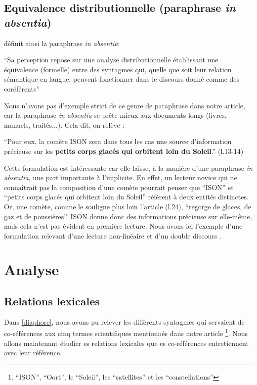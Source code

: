 \documentclass[a4paper,10pt]{article}
\begin{document}
	\subsection{Equivalence distributionnelle (paraphrase \textit{in absentia})}
		\cite{Mortureux1993} définit ainsi la paraphrase \textit{in absentia}:
		\begin{center}
			\footnotesize
			\begin{minipage}{0.7\textwidth}
				``Sa perception repose sur une analyse distributionnelle établissant une équivalence (formelle) entre des syntagmes qui, quelle que soit leur relation sémantique en langue, peuvent fonctionner dans le discours donné comme des coréférents''
			\end{minipage}
		\end{center}
		Nous n'avons pas d'exemple strict de ce genre de paraphrase dans notre article, car la paraphrase \textit{in absentia} se prête mieux aux documents longs (livres, manuels, traités...). Cela dit, on relève :
		\begin{center}
			\footnotesize
			\begin{minipage}{0.7\textwidth}
				``Pour eux, la comète ISON sera dans tous les cas une source d'information précieuse sur les \textbf{petits corps glacés qui orbitent loin du Soleil}.'' (l.13-14)
			\end{minipage}
		\end{center}
		Cette formulation est intéressante car elle laisse, à la manière d'une paraphrase \textit{in absentia}, une part importante à l'implicite. En effet, un lecteur novice qui ne connaîtrait pas la composition d'une comète pourrait penser que ``ISON'' et ``petits corps glacés qui orbitent loin du Soleil'' réfèrent à deux entités distinctes. Or, une comète, comme le souligne plus loin l'article (l.24), ``regorge de glaces, de gaz et de poussières''. ISON donne donc des informations précieuse sur elle-même, mais cela n'est pas évident en première lecture. Nous avons ici l'exemple d'une formulation relevant d'une lecture non-linéaire et d'un double discours \cite{Mortureux1984}.
		
\section{Analyse}
	\subsection{Relations lexicales}
		Dans \ref{diaphore}, nous avons pu relever les différents syntagmes qui servaient de co-références aux cinq termes scientifiques mentionnés dans notre article \footnote{``ISON'', ``Oort'', le ``Soleil'', les ``satellites'' et les ``constellations''}. Nous allons maintenant étudier es relations lexicales que es co-références entretiennent avec leur référence.
\end{document}
